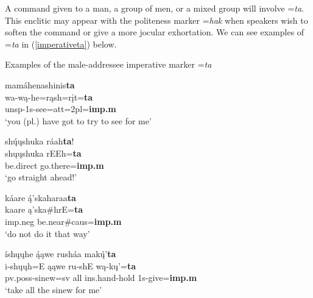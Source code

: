 
A command given to a man, a group of men, or a mixed group will involve =\textit{ta}. This enclitic may appear with the politeness marker =\textit{hak} when speakers wish to soften the command or give a more jocular exhortation. We can see examples of =\textit{ta} in (\ref{imperativeta}) below.

\begin{exe}

\item\label{imperativeta} Examples of the male-addressee imperative marker =\textit{ta}

	\begin{xlist}

	\item\label{imperativeta1}
	\glll mamáhenashinis\textbf{ta}\\
	wa-wą-he=rąsh=rįt=\textbf{ta}\\
	unsp-1s-\textnormal{see}=att=2pl=\textbf{imp.m}\\
	\glt `you (pl.) have got to try to see for me' \citep[35]{hollow1973a}

	\item\label{imperativeta2}
	\glll shų́ųshuka ráah\textbf{ta}!\\
	shųųshuka rEEh=\textbf{ta}\\
	\textnormal{be.direct} \textnormal{go.there}=\textbf{imp.m}\\
	\glt `go straight ahead!' \citep[35]{hollow1973a}

	\item\label{imperativeta3}
	\glll káare ą́'skaharaa\textbf{ta}\\
	kaare ą'ska\#hrE=\textbf{ta}\\
	imp.neg \textnormal{be.near}\#caus=\textbf{imp.m}\\
	\glt `do not do it that way' \citep[38]{hollow1973a}

	\item\label{imperativeta4}
	\glll íshųųhe ą́ąwe rusháa makų́'\textbf{ta}\\
	i-shųųh=E ąąwe ru-shE wą-kų'=\textbf{ta}\\
	pv.poss-\textnormal{sinew}=sv \textnormal{all} ins.hand-\textnormal{hold} 1s-\textnormal{give}=\textbf{imp.m}\\
	\glt `take all the sinew for me' \citep[78]{hollow1973a}
	 
	\end{xlist}

\end{exe}

